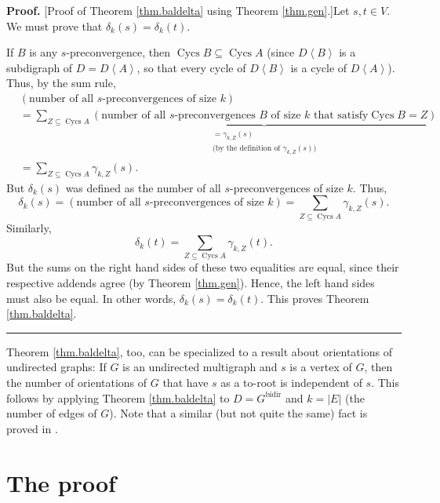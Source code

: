 \documentclass[numbers=enddot,12pt,final,onecolumn,notitlepage]{scrartcl}%
\theoremstyle{definition}
\newenvironment{proof}[1][Proof]{\noindent\textbf{#1.} }{\ \rule{0.5em}{0.5em}}
\let\sumnonlimits\sum
\renewcommand{\sum}{\sumnonlimits\limits}
\theoremstyle{plainsl}
\begin{document}
\begin{proof}
[Proof of Theorem \ref{thm.baldelta} using Theorem \ref{thm.gen}.]Let $s,t\in
V$. We must prove that $\delta_{k}\left(  s\right)  =\delta_{k}\left(
t\right)  $.

If $B$ is any $s$-preconvergence, then $\operatorname*{Cycs}B\subseteq
\operatorname*{Cycs}A$ (since $D\left\langle B\right\rangle $ is a subdigraph
of $D=D\left\langle A\right\rangle $, so that every cycle of $D\left\langle
B\right\rangle $ is a cycle of $D\left\langle A\right\rangle $). Thus, by the
sum rule,%
\begin{align*}
&  \left(  \text{number of all }s\text{-preconvergences of size }k\right)  \\
&  =\sum_{Z\subseteq\operatorname*{Cycs}A}\underbrace{\left(  \text{number of
all }s\text{-preconvergences }B\text{ of size }k\text{ that satisfy
}\operatorname*{Cycs}B=Z\right)  }_{\substack{=\gamma_{k,Z}\left(  s\right)
\\\text{(by the definition of }\gamma_{k,Z}\left(  s\right)  \text{)}}}\\
&  =\sum_{Z\subseteq\operatorname*{Cycs}A}\gamma_{k,Z}\left(  s\right)  .
\end{align*}
But $\delta_{k}\left(  s\right)  $ was defined as the number of all
$s$-preconvergences of size $k$. Thus,%
\[
\delta_{k}\left(  s\right)  =\left(  \text{number of all }%
s\text{-preconvergences of size }k\right)  =\sum_{Z\subseteq
\operatorname*{Cycs}A}\gamma_{k,Z}\left(  s\right)  .
\]
Similarly,%
\[
\delta_{k}\left(  t\right)  =\sum_{Z\subseteq\operatorname*{Cycs}A}%
\gamma_{k,Z}\left(  t\right)  .
\]
But the sums on the right hand sides of these two equalities are equal, since
their respective addends agree (by Theorem \ref{thm.gen}). Hence, the left
hand sides must also be equal. In other words, $\delta_{k}\left(  s\right)
=\delta_{k}\left(  t\right)  $. This proves Theorem \ref{thm.baldelta}.
\end{proof}

Theorem \ref{thm.baldelta}, too, can be specialized to a result about
orientations of undirected graphs: If $G$ is an undirected multigraph and $s$
is a vertex of $G$, then the number of orientations of $G$ that have $s$ as a
to-root is independent of $s$. This follows by applying Theorem
\ref{thm.baldelta} to $D=G^{\operatorname*{bidir}}$ and $k=\left\vert
E\right\vert $ (the number of edges of $G$). Note that a similar (but not
quite the same) fact is proved in \cite[Theorem 3.4]{Gioan07}.


\section{The proof}
\end{document}
